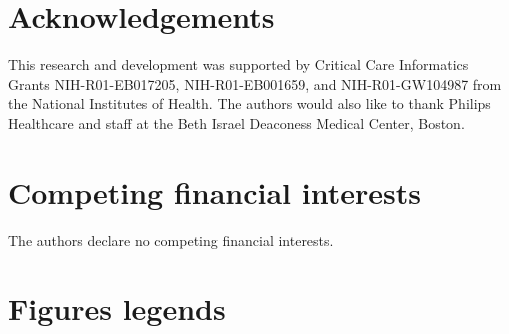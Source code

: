 \documentclass[english]{article}
\begin{document}

\section*{Acknowledgements}


This research and development was supported by Critical Care Informatics Grants NIH-R01-EB017205, NIH-R01-EB001659, and NIH-R01-GW104987 from the National Institutes of Health. The authors would also like to thank Philips Healthcare and staff at the Beth Israel Deaconess Medical Center, Boston.

\section*{Competing financial interests}

The authors declare no competing financial interests.

\section*{Figures legends}


\end{document}
